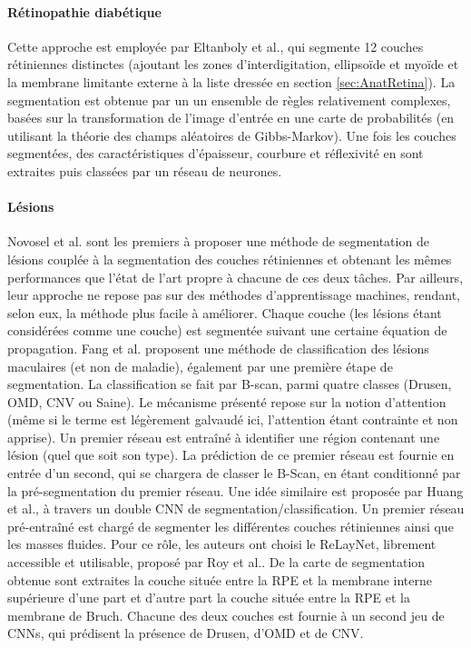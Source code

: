 \paragraph{Rétinopathie diabétique} Cette approche est employée par Eltanboly et al.\cite{eltanbolyComputeraidedDiagnosticSystem2017a}, qui segmente 12 couches rétiniennes distinctes (ajoutant les zones d'interdigitation, ellipsoïde et myoïde et la membrane limitante externe à la liste dressée en section \ref{sec:AnatRetina}). La segmentation est obtenue par un un ensemble de règles relativement complexes, basées sur la transformation de l'image d'entrée en une carte de probabilités (en utilisant la théorie des champs aléatoires de Gibbs-Markov). Une fois les couches segmentées, des caractéristiques d'épaisseur, courbure et réflexivité en sont extraites puis classées par un réseau de neurones. 
\paragraph{Lésions}
Novosel et al.\cite{novoselJointSegmentationRetinal2017} sont les premiers à proposer une méthode de segmentation de lésions couplée à la segmentation des couches rétiniennes et obtenant les mêmes performances que l'état de l'art propre à chacune de ces deux tâches. Par ailleurs, leur approche ne repose pas sur des méthodes d'apprentissage machines, rendant, selon eux, la méthode plus facile à améliorer. Chaque couche (les lésions étant considérées comme une couche) est segmentée suivant une certaine équation de propagation. 
Fang et al.\cite{fangAttentionLesionLesionAware2019} proposent une méthode de classification des lésions maculaires (et non de maladie), également par une première étape de segmentation. La classification se fait par B-scan, parmi quatre classes (Drusen, \ac{OMD}, \ac{CNV} ou Saine). Le mécanisme présenté repose sur la notion d'attention (même si le terme est légèrement galvaudé ici, l'attention étant contrainte et non apprise). Un premier réseau est entraîné à identifier une région contenant une lésion (quel que soit son type). La prédiction de ce premier réseau est fournie en entrée d'un second, qui se chargera de classer le B-Scan, en étant conditionné par la pré-segmentation du premier réseau. Une idée similaire est proposée par Huang et al.\cite{huangAutomaticClassificationRetinal2019}, à travers un double \ac{CNN} de segmentation/classification. Un premier réseau pré-entraîné est chargé de segmenter les différentes couches rétiniennes ainsi que les masses fluides. Pour ce rôle, les auteurs ont choisi le ReLayNet, librement accessible et utilisable, proposé par Roy et al.\cite{royReLayNetRetinalLayer2017}. De la carte de segmentation obtenue sont extraites la couche située entre la \ac{RPE} et la membrane interne supérieure d'une part et d'autre part la couche située entre la \ac{RPE} et la membrane de Bruch. Chacune des deux couches est fournie à un second jeu de \ac{CNN}s, qui prédisent la présence de Drusen, d'\ac{OMD} et de \ac{CNV}.

